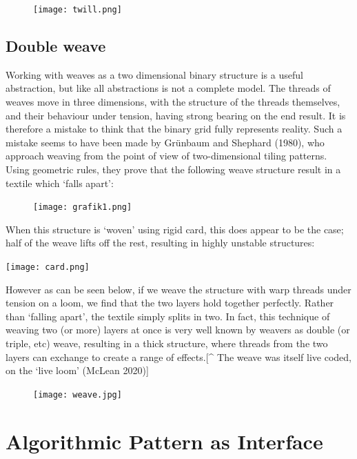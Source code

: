 \documentclass{nime-alternate} %
\begin{document}
\begin{figure}[h]
\texttt{[image: twill.png]}
\end{figure}

\hypertarget{double-weave}{%
\subsection{Double weave}\label{double-weave}}

Working with weaves as a two dimensional binary structure is a useful
abstraction, but like all abstractions is not a complete model. The
threads of weaves move in three dimensions, with the structure of the
threads themselves, and their behaviour under tension, having strong
bearing on the end result. It is therefore a mistake to think that the
binary grid fully represents reality. Such a mistake seems to have been
made by Grünbaum and Shephard (1980), who approach weaving from the
point of view of two-dimensional tiling patterns. Using geometric rules,
they prove that the following weave structure result in a textile which
`falls apart':

\begin{figure}[h]
\texttt{[image: grafik1.png]}
\end{figure}

When this structure is `woven' using rigid card, this does appear to be
the case; half of the weave lifts off the rest, resulting in highly
unstable structures:

\texttt{[image: card.png]}

However as can be seen below, if we weave the structure with warp
threads under tension on a loom, we find that the two layers hold
together perfectly. Rather than `falling apart', the textile simply
splits in two. In fact, this technique of weaving two (or more) layers
at once is very well known by weavers as double (or triple, etc) weave,
resulting in a thick structure, where threads from the two layers can
exchange to create a range of effects.{[}\^{} The weave was itself live
coded, on the `live loom' (McLean 2020){]}

\begin{figure}[h]
\texttt{[image: weave.jpg]}
\end{figure}

\hypertarget{algorithmic-pattern-as-interface}{%
\section{Algorithmic Pattern as
Interface}\label{algorithmic-pattern-as-interface}}
\end{document}
